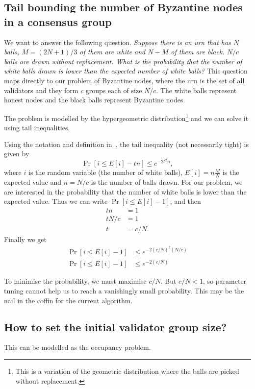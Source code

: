 \subsection{Tail bounding the number of Byzantine nodes in a consensus group}
We want to answer the following question. \emph{Suppose there is an urn that has
  $N$ balls, $M = (2N+1)/3$ of them are white and $N - M$ of them are black.
  $N/c$ balls are drawn without replacement. What is the probability that the
  number of white balls drawn is lower than the expected number of white balls?}
This question maps directly to our problem of Byzantine nodes, where the urn is
the set of all validators and they form $c$ groups each of size $N/c$. The white
balls represent honest nodes and the black balls represent Byzantine nodes.

The problem is modelled by the hypergeometric distribution\footnote{This is a
  variation of the geometric distribution where the balls are picked without
  replacement.} and we can solve it using tail inequalities.

Using the notation and definition in~\cite{skala2013hypergeometric}, the tail
inequality (not necessarily tight) is given by
\[
\Pr[ i \le E[i] - tn ] \le e^{-2t^2n},
\]
where $i$ is the random variable (the number of white balls), $E[i] = n
\frac{M}{N}$ is the expected value and $n = N/c$ is the number of balls drawn.
For our problem, we are interested in the probability that the number of white
balls is lower than the expected value. Thus we can write $\Pr[i \le E[i] - 1]$,
and then
\begin{align*}
  tn &= 1 \\
  tN/c &= 1 \\
  t &= c/N.
\end{align*}
Finally we get
\begin{align*}
  \Pr[ i \le E[i] - 1] &\le e^{-2 (c/N)^2 (N/c)} \\
  \Pr[ i \le E[i] - 1] &\le e^{-2 (c/N)}
\end{align*}

To minimise the probability, we must maximise $c/N$. But $c/N < 1$, so parameter
tuning cannot help us to reach a vanishingly small probability. This may be the
nail in the coffin for the current algorithm.


\subsection{How to set the initial validator group size?}
This can be modelled as the occupancy problem.


